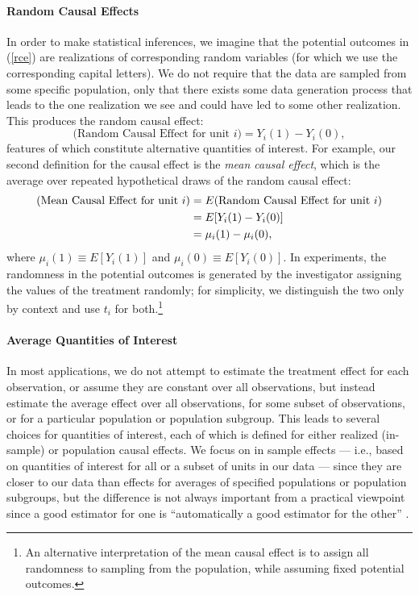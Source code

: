 \documentclass[11pt,titlepage]{article}
\begin{document}
\paragraph{Random Causal Effects} In order to make statistical
inferences, we imagine that the potential outcomes in (\ref{rce}) are
realizations of corresponding random variables (for which we use the
corresponding capital letters).  We do not require that the data are
sampled from some specific population, only that there exists some
data generation process that leads to the one realization we see and
could have led to some other realization.  This produces the random
causal effect:
\begin{equation}
  \label{rance}
  \text{(Random Causal Effect for unit $i$)}  = Y_i(1) - Y_i(0),
\end{equation}
features of which constitute alternative quantities of interest.  For
example, our second definition for the causal effect is the \emph{mean
  causal effect}, which is the average over repeated hypothetical
draws of the random causal effect:
\begin{align}
  \label{meance} \text{(Mean Causal Effect for unit $i$)}
  &= E(\text{Random Causal Effect for unit $i$})\\
  &= E[Y_i(1) - Y_i(0)]\\ \notag &= \mu_i(1) - \mu_i(0),
\end{align}
where $\mu_i(1)\equiv E[Y_i(1)]$ and $\mu_i(0)\equiv E[Y_i(0)]$.  In
experiments, the randomness in the potential outcomes is generated by
the investigator assigning the values of the treatment randomly; for
simplicity, we distinguish the two only by context and use $t_i$ for
both.\footnote{An alternative interpretation of the mean causal effect
  is to assign all randomness to sampling from the population, while
  assuming fixed potential outcomes.}

\paragraph{Average Quantities of Interest}
In most applications, we do not attempt to estimate the treatment
effect for each observation, or assume they are constant over all
observations, but instead estimate the average effect over all
observations, for some subset of observations, or for a particular
population or population subgroup.  This leads to several choices for
quantities of interest, each of which is defined for either realized
(in-sample) or population causal effects.  We focus on in sample
effects --- i.e., based on quantities of interest for all or a subset
of units in our data --- since they are closer to our data than
effects for averages of specified populations or population subgroups,
but the difference is not always important from a practical viewpoint
since a good estimator for one is ``automatically a good estimator for
the other'' \citep[p.6]{Imbens04}.
\end{document}
